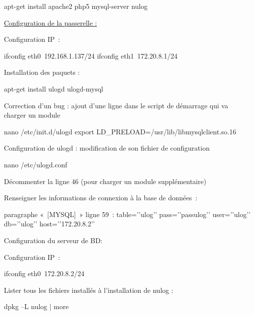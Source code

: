 \documentclass[12pt]{report}
\begin{document}
\begin{itemize}
apt-get install apache2 php5 mysql-server nulog
\newline

\underline{Configuration de la passerelle :}
\newline

Configuration IP :
\newline

ifconfig eth0 192.168.1.137/24
\newline
ifconfig eth1 172.20.8.1/24
\newline

Installation des paquets :
\newline

apt-get install ulogd ulogd-mysql
\newline

Correction d'un bug : ajout d’une ligne dans le script de démarrage qui va charger un module
\newline

nano /etc/init.d/ulogd
\newline
export LD_PRELOAD=/usr/lib/libmysqlclient.so.16
\newline

Configuration de ulogd : modification de son fichier de configuration
\newline

nano /etc/ulogd.conf
\newline

Décommenter la ligne 46 (pour charger un module supplémentaire)
\newline

Renseigner les informations de connexion à la base de données :
\newline

paragraphe « [MYSQL] » ligne 59 :
table=’’ulog’’
pass=’’passulog’’
user=’’ulog’’
db=’’ulog’’
host=’’172.20.8.2’’

\newline
Configuration du serveur de BD:
\newline

Configuration IP :
\newline

ifconfig eth0 172.20.8.2/24
\newline

Lister tous les fichiers installés à l’installation de nulog :
\newline

dpkg –L nulog | more
\newline


\end{itemize}
\end{document}
